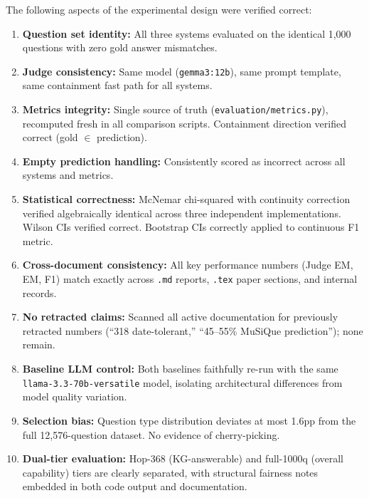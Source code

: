 The following aspects of the experimental design were verified correct:

\begin{enumerate}
\item \textbf{Question set identity:} All three systems evaluated on the identical 1{,}000 questions with zero gold answer mismatches.

\item \textbf{Judge consistency:} Same model (\texttt{gemma3:12b}), same prompt template, same containment fast path for all systems.

\item \textbf{Metrics integrity:} Single source of truth (\texttt{evaluation/metrics.py}), recomputed fresh in all comparison scripts. Containment direction verified correct (gold $\in$ prediction).

\item \textbf{Empty prediction handling:} Consistently scored as incorrect across all systems and metrics.

\item \textbf{Statistical correctness:} McNemar chi-squared with continuity correction verified algebraically identical across three independent implementations. Wilson CIs verified correct. Bootstrap CIs correctly applied to continuous F1 metric.

\item \textbf{Cross-document consistency:} All key performance numbers (Judge EM, EM, F1) match exactly across \texttt{.md} reports, \texttt{.tex} paper sections, and internal records.

\item \textbf{No retracted claims:} Scanned all active documentation for previously retracted numbers (``318 date-tolerant,'' ``45--55\% MuSiQue prediction''); none remain.

\item \textbf{Baseline LLM control:} Both baselines faithfully re-run with the same \texttt{llama-3.3-70b-versatile} model, isolating architectural differences from model quality variation.

\item \textbf{Selection bias:} Question type distribution deviates at most 1.6pp from the full 12{,}576-question dataset. No evidence of cherry-picking.

\item \textbf{Dual-tier evaluation:} Hop-368 (KG-answerable) and full-1000q (overall capability) tiers are clearly separated, with structural fairness notes embedded in both code output and documentation.
\end{enumerate}

